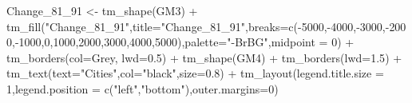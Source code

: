 \documentclass[
]{article}
\newenvironment{Shaded}{\begin{snugshade}}{\end{snugshade}}
\newcommand{\AttributeTok}[1]{\textcolor[rgb]{0.77,0.63,0.00}{#1}}
\newcommand{\DecValTok}[1]{\textcolor[rgb]{0.00,0.00,0.81}{#1}}
\newcommand{\FloatTok}[1]{\textcolor[rgb]{0.00,0.00,0.81}{#1}}
\newcommand{\FunctionTok}[1]{\textcolor[rgb]{0.00,0.00,0.00}{#1}}
\newcommand{\NormalTok}[1]{#1}
\newcommand{\OtherTok}[1]{\textcolor[rgb]{0.56,0.35,0.01}{#1}}
\newcommand{\SpecialCharTok}[1]{\textcolor[rgb]{0.00,0.00,0.00}{#1}}
\newcommand{\StringTok}[1]{\textcolor[rgb]{0.31,0.60,0.02}{#1}}
\begin{document}
\begin{Shaded}
\begin{Highlighting}[]
\NormalTok{Change\_81\_91 }\OtherTok{\textless{}{-}} \FunctionTok{tm\_shape}\NormalTok{(GM3) }\SpecialCharTok{+}
  \FunctionTok{tm\_fill}\NormalTok{(}\StringTok{"Change\_81\_91"}\NormalTok{,}\AttributeTok{title=}\StringTok{"Change\_81\_91"}\NormalTok{,}\AttributeTok{breaks=}\FunctionTok{c}\NormalTok{(}\SpecialCharTok{{-}}\DecValTok{5000}\NormalTok{,}\SpecialCharTok{{-}}\DecValTok{4000}\NormalTok{,}\SpecialCharTok{{-}}\DecValTok{3000}\NormalTok{,}\SpecialCharTok{{-}}\DecValTok{2000}\NormalTok{,}\SpecialCharTok{{-}}\DecValTok{1000}\NormalTok{,}\DecValTok{0}\NormalTok{,}\DecValTok{1000}\NormalTok{,}\DecValTok{2000}\NormalTok{,}\DecValTok{3000}\NormalTok{,}\DecValTok{4000}\NormalTok{,}\DecValTok{5000}\NormalTok{),}\AttributeTok{palette=}\StringTok{"{-}BrBG"}\NormalTok{,}\AttributeTok{midpoint =} \DecValTok{0}\NormalTok{) }\SpecialCharTok{+}
 \FunctionTok{tm\_borders}\NormalTok{(}\AttributeTok{col=}\StringTok{\textquotesingle{}Grey\textquotesingle{}}\NormalTok{, }\AttributeTok{lwd=}\FloatTok{0.5}\NormalTok{) }\SpecialCharTok{+}
\FunctionTok{tm\_shape}\NormalTok{(GM4) }\SpecialCharTok{+}
  \FunctionTok{tm\_borders}\NormalTok{(}\AttributeTok{lwd=}\FloatTok{1.5}\NormalTok{) }\SpecialCharTok{+}
  \FunctionTok{tm\_text}\NormalTok{(}\AttributeTok{text=}\StringTok{"Cities"}\NormalTok{,}\AttributeTok{col=}\StringTok{"black"}\NormalTok{,}\AttributeTok{size=}\FloatTok{0.8}\NormalTok{) }\SpecialCharTok{+}
\FunctionTok{tm\_layout}\NormalTok{(}\AttributeTok{legend.title.size =} \DecValTok{1}\NormalTok{,}\AttributeTok{legend.position =} \FunctionTok{c}\NormalTok{(}\StringTok{"left"}\NormalTok{,}\StringTok{"bottom"}\NormalTok{),}\AttributeTok{outer.margins=}\DecValTok{0}\NormalTok{)}


\end{Highlighting}
\end{Shaded}
\end{document}

